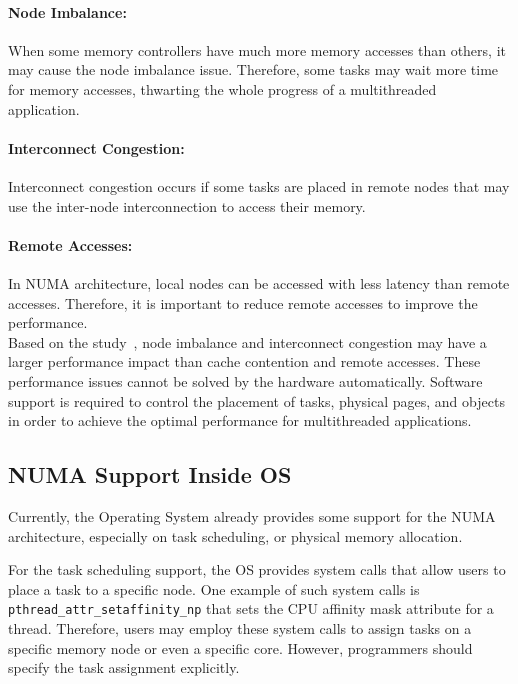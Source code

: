 \paragraph{Node Imbalance:} When some memory controllers have much more memory accesses than others, it may cause the node imbalance issue. Therefore, some tasks may wait more time for memory accesses, thwarting the whole progress of a multithreaded application.  

\paragraph{Interconnect Congestion:} Interconnect congestion occurs if some tasks are placed in remote nodes that may use the inter-node interconnection to access their memory. 

\paragraph{Remote Accesses:} In NUMA architecture, local nodes can be accessed with less latency than remote accesses. Therefore, it is important to reduce remote accesses to improve the performance.\\


 Based on the study~\cite{Blagodurov:2011:CNC:2002181.2002182}, node imbalance and interconnect congestion may have a larger performance impact than cache contention and remote accesses. These performance issues cannot be solved by the hardware automatically. Software support is required to control the placement of tasks, physical pages, and objects in order to achieve the optimal performance for multithreaded applications.  

\subsection{NUMA Support Inside OS}

Currently, the Operating System already provides some support for the NUMA architecture, especially on task scheduling, or physical memory allocation. 

For the task scheduling support, the OS provides  system calls that allow users to place a task to a specific node. One example of such system calls is \texttt{pthread\_attr\_setaffinity\_np} that   sets the CPU affinity mask attribute  for a thread. Therefore, users may employ these system calls to assign tasks on a specific memory node or even a specific core. However, programmers should specify the task assignment explicitly. 

